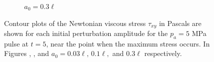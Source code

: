 \begin{figure}
\begin{subfigure}[b]{0.32\textwidth}
%
    \caption{\label{fig:tauxy_snapshot_A50_a30} $a_0 = 0.3\ell$}
  \end{subfigure}
  \caption{Contour plots of the Newtonian viscous stress $\tau_{xy}$
    in Pascals are shown for each initial perturbation amplitude for
    the $p_a=5$ MPa pulse at $t=5$, near the point when the maximum
    stress occurs. In Figures ,
    , and
     $a_0=0.03\ell,\, 0.1\ell,$ and
    $0.3\ell$ respectively.  }
  \label{fig:tauxy_snapshots}
\end{figure}
% 
